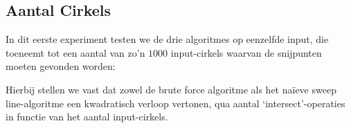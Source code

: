 \documentclass[12pt]{article}
\begin{document}
\subsection{Aantal Cirkels}
In dit eerste experiment testen we de drie algoritmes op eenzelfde input, die toeneemt tot een aantal van zo'n $1000$ input-cirkels waarvan de snijpunten moeten gevonden worden:

\begin{center}
\end{center}

Hierbij stellen we vast dat zowel de brute force algoritme als het naïeve sweep line-algoritme een kwadratisch verloop vertonen, qua aantal `intersect'-operaties in functie van het aantal input-cirkels.


%	
\end{document}
